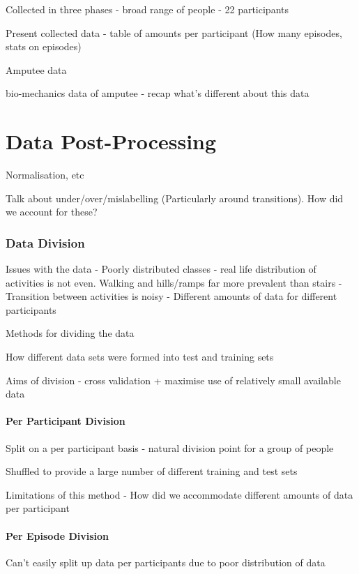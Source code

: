 Collected in three phases - 
broad range of people - 22 participants

Present collected data - table of amounts per participant (How many episodes, stats on episodes)

Amputee data

bio-mechanics data of amputee - recap what's different about this data



\section{Data Post-Processing}
Normalisation, etc

Talk about under/over/mislabelling (Particularly around transitions). How did we account for these?

\subsubsection{Data Division}
Issues with the data
    - Poorly distributed classes - real life distribution of activities is not even. Walking and hills/ramps far more prevalent than stairs
    - Transition between activities is noisy
    - Different amounts of data for different participants

Methods for dividing the data

How different data sets were formed into test and training sets

Aims of division - cross validation + maximise use of relatively small available data

\paragraph{Per Participant Division}
Split on a per participant basis - natural division point for a group of people

Shuffled to provide a large number of different training and test sets

Limitations of this method
 - How did we accommodate different amounts of data per participant

\paragraph{Per Episode Division}
Can't easily split up data per participants due to poor distribution of data

